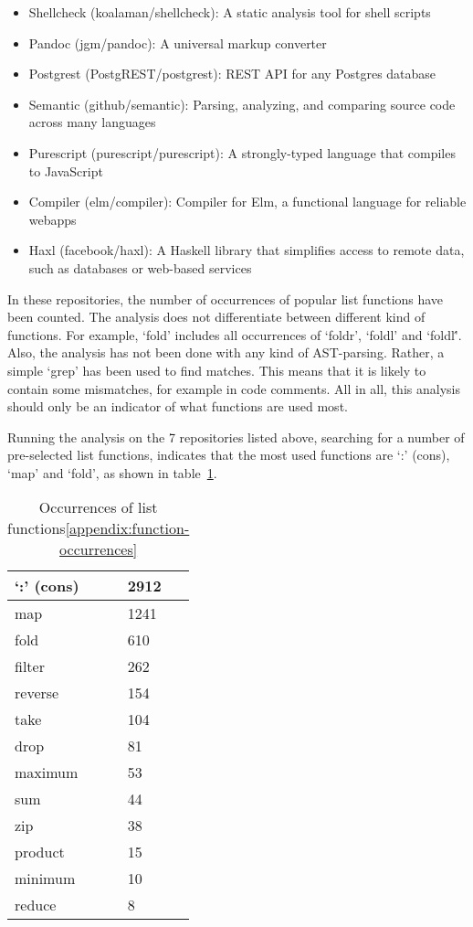 \begin{itemize}
    \item Shellcheck (koalaman/shellcheck\cite{github-shellcheck}): A static analysis tool for shell scripts
    \item Pandoc (jgm/pandoc\cite{github-pandoc}): A universal markup converter
    \item Postgrest (PostgREST/postgrest\cite{github-postgrest}): REST API for any Postgres database
    \item Semantic (github/semantic\cite{github-semantic}): Parsing, analyzing, and comparing source code across many languages
    \item Purescript (purescript/purescript\cite{github-purescript}): A strongly-typed language that compiles to JavaScript
    \item Compiler (elm/compiler\cite{github-elmcompiler}): Compiler for Elm, a functional language for reliable webapps
    \item Haxl (facebook/haxl\cite{github-haxl}): A Haskell library that simplifies access to remote data, such as databases or web-based services
\end{itemize}

In these repositories, the number of occurrences of popular list functions have been counted. The analysis does not
differentiate between different kind of functions. For example, `fold' includes all occurrences of `foldr', `foldl' and `foldl\''.
Also, the analysis has not been done with any kind of AST-parsing. Rather, a simple `grep' has been used to find matches. This means
that it is likely to contain some mismatches, for example in code comments. All in all, this analysis should only be
an indicator of what functions are used most.

Running the analysis on the 7 repositories listed above, searching for a number of pre-selected list functions, indicates
that the most used functions are `:' (cons), `map' and `fold', as shown in table~\ref{tab:occurrences-list-funcs}.

\begin{table}[htb]
\centering
\caption{Occurrences of list functions\ref{appendix:function-occurrences}}\label{tab:occurrences-list-funcs}
\begin{tabular}{ll}
\toprule
`:' (cons) & 2912 \\
\midrule
map & 1241 \\
\midrule
fold & 610 \\
\midrule
filter & 262 \\
\midrule
reverse & 154 \\
\midrule
take & 104 \\
\midrule
drop & 81 \\
\midrule
maximum & 53 \\
\midrule
sum & 44 \\
\midrule
zip & 38 \\
\midrule
product & 15 \\
\midrule
minimum & 10 \\
\midrule
reduce & 8
\end{tabular}
\end{table}

